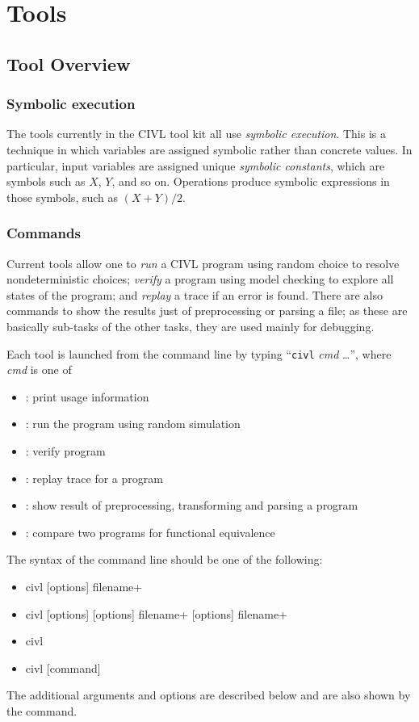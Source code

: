 \part{Tools}
\label{part:tools}

\chapter{Tool Overview}

\section{Symbolic execution}

The tools currently in the CIVL tool kit all use \emph{symbolic
  execution}.  This is a technique in which variables are assigned
symbolic rather than concrete values.  In particular, input variables
are assigned unique \emph{symbolic constants}, which are symbols such
as $X$, $Y$, and so on.  Operations produce symbolic expressions in
those symbols, such as $(X+Y)/2$.

\section{Commands}

Current tools allow one to \emph{run} a CIVL program using random
choice to resolve nondeterministic choices; \emph{verify} a program
using model checking to explore all states of the program; and
\emph{replay} a trace if an error is found.  There are also commands
to show the results just of preprocessing or parsing a file; as these
are basically sub-tasks of the other tasks, they are used mainly for
debugging.

Each tool is launched from the command line by typing ``\texttt{civl}
\textit{cmd} \ldots'', where \textit{cmd} is one of
\begin{itemize}
\item {} : print usage information
\item {}  : run the program using random simulation
\item {} : verify program
\item {} : replay trace for a program
\item {} : show result of preprocessing, transforming and parsing a program
\item {}: compare two programs for functional equivalence
\end{itemize}
The syntax of the command line should be one of the following:
\begin{itemize}
\item civl  [options] filename+
\item civl  [options]  [options] filename+  [options] filename+
\item civl 
\item civl  [command]
\end{itemize}
The additional arguments and options are described below and are also
shown by the  command.

